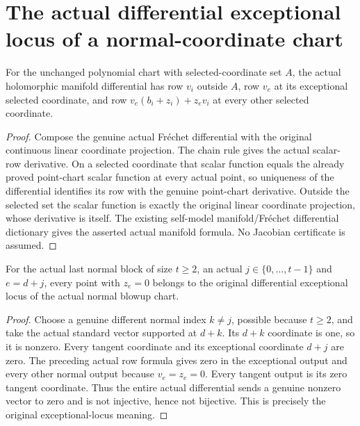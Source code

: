 \section{The actual differential exceptional locus of a normal-coordinate chart}

\begin{theorem}
\label{hir:actual-normal-blowup-differential-coordinates}
For the unchanged polynomial chart with selected-coordinate set $A$,
the actual holomorphic manifold differential has row $v_i$ outside
$A$, row $v_e$ at its exceptional selected coordinate, and row
$v_e(b_i+z_i)+z_ev_i$ at every other selected coordinate.
\leanok
\end{theorem}
\begin{proof}
Compose the genuine actual Fr\'echet differential with the original
continuous linear coordinate projection. The chain rule gives the
actual scalar-row derivative. On a selected coordinate that scalar
function equals the already proved point-chart scalar function at
every actual point, so uniqueness of the differential identifies its
row with the genuine point-chart derivative. Outside the selected
set the scalar function is exactly the original linear coordinate
projection, whose derivative is itself. The existing self-model
manifold/Fr\'echet differential dictionary gives the asserted actual
manifold formula. No Jacobian certificate is assumed.
\end{proof}

\begin{theorem}
\label{hir:actual-normal-blowup-hyperplane-exceptional}
For the actual last normal block of size $t\ge2$, an actual
$j\in\{0,\ldots,t-1\}$ and $e=d+j$, every point with $z_e=0$
belongs to the original differential exceptional locus of the actual
normal blowup chart.
\leanok
\end{theorem}
\begin{proof}
Choose a genuine different normal index $k\ne j$, possible because
$t\ge2$, and take the actual standard vector supported at $d+k$.
Its $d+k$ coordinate is one, so it is nonzero. Every tangent coordinate
and its exceptional coordinate $d+j$ are zero. The preceding actual
row formula gives zero in the exceptional output and every other
normal output because $v_e=z_e=0$. Every tangent output is its zero
tangent coordinate. Thus the entire actual differential sends a
genuine nonzero vector to zero and is not injective, hence not
bijective. This is precisely the original exceptional-locus meaning.
\end{proof}

